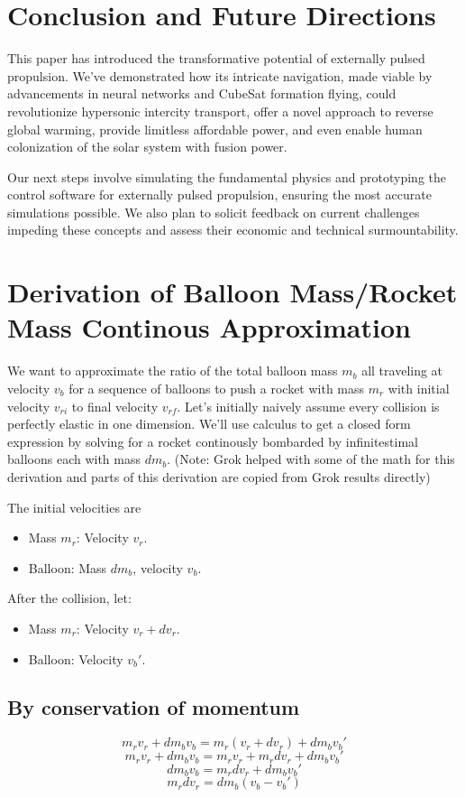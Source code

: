 \documentclass{article}
\begin{document}
\section{Conclusion and Future Directions}
This paper has introduced the transformative potential of externally pulsed propulsion. We've demonstrated how its intricate navigation, made viable by advancements in neural networks and CubeSat formation flying, could revolutionize hypersonic intercity transport, offer a novel approach to reverse global warming, provide limitless affordable power, and even enable human colonization of the solar system with fusion power. 

Our next steps involve simulating the fundamental physics and prototyping the control software for externally pulsed propulsion, ensuring the most accurate simulations possible. We also plan to solicit feedback on current challenges impeding these concepts and assess their economic and technical surmountability.

\appendix 
\section{Derivation of Balloon Mass/Rocket Mass Continous Approximation}\label{sec:balloon_ratio_approximation}  We want to approximate the ratio of the total balloon mass \(m_b\) all traveling at velocity \(v_b\) for a sequence of balloons to push a rocket with mass \(m_r\) with initial velocity \(v_{ri}\) to final velocity \(v_{rf}\).   Let's initially naively assume every collision is perfectly elastic in one dimension.   We'll use calculus to get a  closed form expression by solving for a rocket  continously bombarded by infinitestimal balloons each with mass \(dm_b\).   (Note: Grok \cite{grok}  helped with some of the math for this derivation and parts of this derivation are copied from Grok  results directly)

The initial velocities are
\begin{itemize}
\item Mass \( m_r \): Velocity \( v_r \).
\item Balloon: Mass \( dm_b \), velocity \( v_b \).
\end{itemize}
After the collision, let:
\begin{itemize}
    \item Mass \( m_r \): Velocity \( v_r + dv_r \).
    \item Balloon: Velocity \( v_b' \).
\end{itemize}
\subsection{By conservation of momentum} \[
m_r v_r + dm_b v_b = m_r (v_r + dv_r) + dm_b v_b'
\]
\[
m_r v_r + dm_b v_b = m_r v_r + m_r dv_r + dm_b v_b'
\]
\[
dm_b v_b = m_r dv_r + dm_b v_b'
\]
\begin{equation}
m_r dv_r = dm_b (v_b - v_b') \label{eq:momentum}
\end{equation}
\end{document}
